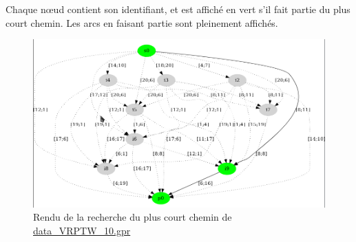 \documentclass{scrreprt}
\begin{document}
	Chaque nœud contient son identifiant, et est affiché en vert s'il fait partie du plus court chemin. Les arcs en faisant partie sont pleinement affichés.
	
	\begin{figure}[h]
		\begin{center}
			\includegraphics[scale=0.7]{render_pcc}
		\end{center}
		\caption{\label{render_pcc} Rendu de la recherche du plus court chemin de \url{data_VRPTW_10.gpr}}
	\end{figure}
	\newpage
	
\end{document}
